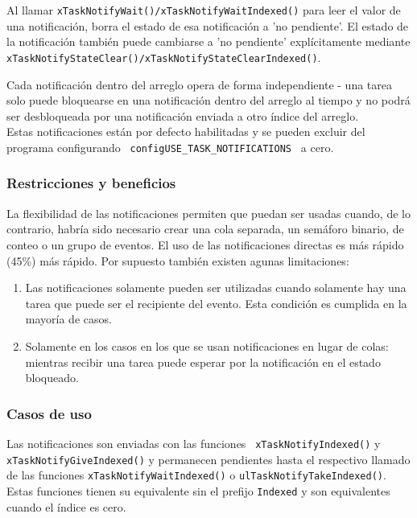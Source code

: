 Al llamar \texttt{xTaskNotifyWait()/xTaskNotifyWaitIndexed()} para leer el valor de una notificación, borra el estado de esa notificación a 'no pendiente'. El estado de la notificación también puede cambiarse a 'no pendiente' explícitamente mediante \texttt{xTaskNotifyStateClear()/xTaskNotifyStateClearIndexed()}.

Cada notificación dentro del arreglo opera de forma independiente - una tarea solo puede bloquearse en una notificación dentro del arreglo al tiempo y no podrá ser desbloqueada por una notificación enviada a otro índice del arreglo.\\

Estas notificaciones están por defecto habilitadas y se pueden excluir del programa configurando \texttt{ configUSE\_TASK\_NOTIFICATIONS } a cero.

\subsubsection{Restricciones y beneficios}

La flexibilidad de las notificaciones permiten que puedan ser usadas cuando, de lo contrario, habría sido necesario crear una cola separada, un semáforo binario, de conteo o un grupo de eventos. El uso de las notificaciones directas es más rápido (45\%) más rápido. Por supuesto también existen agunas limitaciones:

\begin{enumerate}
    \item Las notificaciones solamente pueden ser utilizadas cuando solamente hay una tarea que puede ser el recipiente del evento. Esta condición es cumplida en la mayoría de casos.
    \item Solamente en los casos en los que se usan notificaciones en lugar de colas: mientras recibir una tarea puede esperar por la notificación en el estado bloqueado.
\end{enumerate}

\subsubsection{Casos de uso}

Las notificaciones son enviadas con las funciones \texttt{ xTaskNotifyIndexed()} y \texttt{xTaskNotifyGiveIndexed()} y permanecen pendientes hasta el respectivo llamado de las funciones \texttt{xTaskNotifyWaitIndexed()} o \texttt{ulTaskNotifyTakeIndexed()}. Estas funciones tienen su equivalente sin el prefijo \texttt{Indexed} y son equivalentes cuando el índice es cero. 

